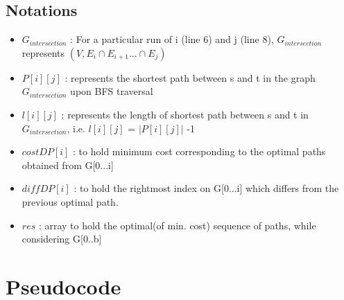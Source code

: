\documentclass{article}
\begin{document}
\subsection{Notations}
\begin{itemize}
    \item $G_{intersection}$ : For a particular run of i (line 6) and j (line 8), $G_{intersection}$ represents $(V,E_{i} \cap E_{i+1} ... \cap E_{j})$
    \item $P[i][j]$ : represents the shortest path between s and t in the graph $G_{intersection}$ upon BFS traversal
    \item $l[i][j]$ : represents the length of shortest path between s and t in $G_{intersection}$, i.e. $l[i][j]$ = $|P[i][j]|$ -1
    \item $costDP[i]$ : to hold minimum cost corresponding to the optimal paths obtained from G[0...i]
    \item $diffDP[i]$ : to hold the rightmost index on G[0...i] which differs from the previous optimal path.
    \item $res$ : array to hold the optimal(of min. cost) sequence of paths, while considering G[0..b]
\end{itemize}

\newpage
\section{Pseudocode}
\end{document}
